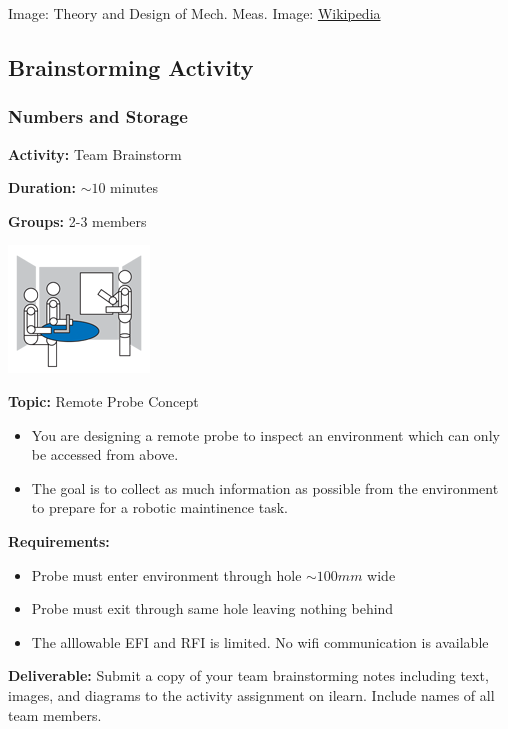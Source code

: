 \documentclass[fleqn]{beamer} %
\newcommand{\sectionIVtitle}{Numbers and Storage}
\newcommand{\sectionIsubsectionIIItitle}{Brainstorming Activity}
\begin{document}
\begin{frame}
				{\tiny Image: Theory and Design of Mech. Meas. \hspace{20mm} Image: \href{https://en.wikipedia.org/wiki/Thermocouple}{Wikipedia} }
			\end{frame}

		\subsection{\sectionIsubsectionIIItitle}\label{sectionIsubsectionIII}
			\begin{frame} 
				\frametitle{\sectionIVtitle}
				
				\begin{multicols}{2}
					\tiny

					{\bf Activity:} Team Brainstorm

					{\bf Duration:} $\sim 10$ minutes

					{\bf Groups:} 2-3 members

					\includegraphics[scale=0.5]{images/Brainstorm_room.png}

					{\bf Topic:} Remote Probe Concept
					\begin{itemize}
						\item You are designing a remote probe to inspect an environment which can only be accessed from above. 
						\item The goal is to collect as much information as possible from the environment to prepare for a robotic maintinence task. 
			        \end{itemize}

			    \end{multicols}	

			    {\bf Requirements:}	
				\begin{itemize}
					\item Probe must enter environment through hole $\sim 100mm$ wide 
					\item Probe must exit through same hole leaving nothing behind
					\item The alllowable EFI and RFI is limited. No wifi communication is available \vspace{4mm}
				\end{itemize}

				{\bf Deliverable:} Submit a copy of your team brainstorming notes including text, images, and diagrams to the activity assignment on ilearn. Include names of all team members.

			\end{frame}	
\end{document}
